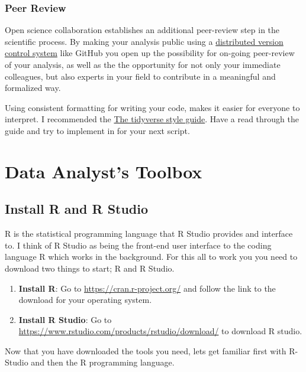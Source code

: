 \documentclass[]{book}
\providecommand{\tightlist}{%
  \setlength{\itemsep}{0pt}\setlength{\parskip}{0pt}}
\begin{document}
\subsection{Peer Review}\label{peer-review}

Open science collaboration establishes an additional peer-review step in
the scientific process. By making your analysis public using a
\href{https://git-scm.com/book/en/v2/Getting-Started-About-Version-Control}{distributed
version control system} like GitHub you open up the possibility for
on-going peer-review of your analysis, as well as the the opportunity
for not only your immediate colleagues, but also experts in your field
to contribute in a meaningful and formalized way.

Using consistent formatting for writing your code, makes it easier for
everyone to interpret. I recommended the
\href{http://style.tidyverse.org}{The tidyverse style guide}. Have a
read through the guide and try to implement in for your next script.

\chapter{Data Analyst's Toolbox}\label{data-analysts-toolbox}

\section{Install R and R Studio}\label{install-r-and-r-studio}

R is the statistical programming language that R Studio provides and
interface to. I think of R Studio as being the front-end user interface
to the coding language R which works in the background. For this all to
work you you need to download two things to start; R and R Studio.

\begin{enumerate}
\def\labelenumi{\arabic{enumi})}
\tightlist
\item
  \textbf{Install R}: Go to \url{https://cran.r-project.org/} and follow
  the link to the download for your operating system.
\item
  \textbf{Install R Studio}: Go to
  \url{https://www.rstudio.com/products/rstudio/download/} to download R
  studio.
\end{enumerate}

Now that you have downloaded the tools you need, lets get familiar first
with R-Studio and then the R programming language.
\end{document}
